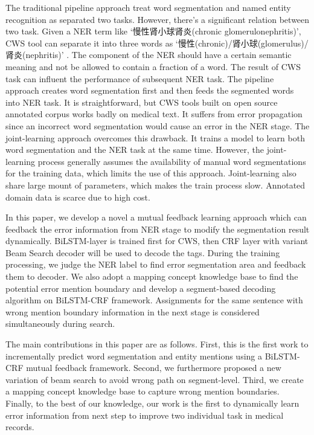 \documentclass[conference]{IEEEtran}
\begin{document}
The traditional pipeline approach treat word segmentation and named entity recognition as separated two tasks\cite{b10,b11,b12}. However, there's a significant relation between two task. Given a NER term like ‘慢性肾小球肾炎(chronic glomerulonephritis)',  CWS tool can separate it into three words as ‘慢性(chronic)/肾小球(glomerulus)/肾炎(nephritis)' . The component of the NER  should have a certain semantic meaning and not be allowed to contain a fraction of a word. The result of CWS task can influent the performance of subsequent NER task. The  pipeline approach creates word segmentation first and then feeds the segmented words into NER task. It is straightforward, but CWS tools built on open source annotated corpus works badly on medical text. It suffers from error propagation since an incorrect word segmentation would cause an error in the NER stage. The joint-learning approach \cite{b6, b13,b14} overcomes this drawback. It trains a model to learn both word segmentation and the NER task at the same time. However, the joint-learning process generally assumes the availability of manual word segmentations for the training data, which limits the use of this approach. Joint-learning also share large mount of parameters, which makes the train process slow. Annotated domain data is scarce due to high cost.

In this paper, we develop a novel  a mutual feedback learning approach which can feedback the error information from NER stage to modify the segmentation result dynamically. BiLSTM-layer is trained first for CWS, then CRF layer with variant Beam Search decoder will be used to decode the tags. During the training processing, we judge the NER label to find error segmentation area and feedback them to decoder. We also adopt a mapping concept knowledge base to find the potential error mention boundary and develop a segment-based decoding algorithm on BiLSTM-CRF framework. Assignments for the same sentence with wrong mention boundary information in the next stage is considered simultaneously during search.

The main contributions in this paper are as follows. First, this is the first work to incrementally predict word segmentation and entity mentions using a BiLSTM-CRF mutual feedback framework. Second, we furthermore proposed a new variation of beam search to avoid wrong path on segment-level. Third, we create a mapping concept knowledge base to capture wrong mention boundaries.  Finally, to the best of our knowledge, our work is the first to dynamically learn error information from next step to improve two individual task in medical records.
\end{document}
